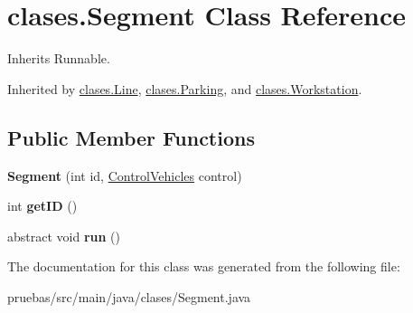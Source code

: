 \hypertarget{classclases_1_1_segment}{}\section{clases.\+Segment Class Reference}
\label{classclases_1_1_segment}


Inherits Runnable.



Inherited by \mbox{\hyperlink{classclases_1_1_line}{clases.\+Line}}, \mbox{\hyperlink{classclases_1_1_parking}{clases.\+Parking}}, and \mbox{\hyperlink{classclases_1_1_workstation}{clases.\+Workstation}}.

\subsection*{Public Member Functions}
\begin{DoxyCompactItemize}
\item 
\mbox{\label{classclases_1_1_segment_a2f51041ae9ba2130c61f731069b05dc5}} 
{\bfseries Segment} (int id, \mbox{\hyperlink{classcontrol_1_1_control_vehicles}{Control\+Vehicles}} control)
\item 
\mbox{\label{classclases_1_1_segment_ae3955a30788c0797ec6c9068a3bce050}} 
int {\bfseries get\+ID} ()
\item 
\mbox{\label{classclases_1_1_segment_ab3f7658070f0da15727d8d852df0073b}} 
abstract void {\bfseries run} ()
\end{DoxyCompactItemize}


The documentation for this class was generated from the following file\+:\begin{DoxyCompactItemize}
\item 
pruebas/src/main/java/clases/Segment.\+java\end{DoxyCompactItemize}
